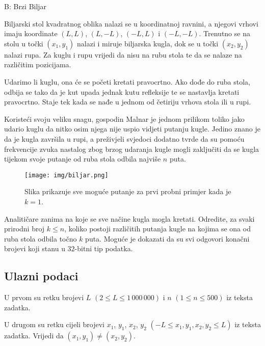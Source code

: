\begin{statement}[
  timelimit=1 s,
  memorylimit=512 MiB,
]{B: Brzi Biljar}

Biljarski stol kvadratnog oblika nalazi se u koordinatnoj ravnini, a njegovi
vrhovi imaju koordinate $(L,L)$, $(L,-L)$, $(-L,L)$ i $(-L,-L)$. Trenutno se
na stolu u točki $(x_1, y_1)$ nalazi i miruje biljarska kugla, dok se u točki
$(x_2, y_2)$ nalazi rupa. Za kuglu i rupu vrijedi da nisu na rubu stola te da
se nalaze na različitim pozicijama.

Udarimo li kuglu, ona će se početi kretati pravocrtno. Ako dođe do ruba stola,
odbija se tako da je kut upada jednak kutu refleksije te se nastavlja kretati
pravocrtno. Staje tek kada se nađe u jednom od četiriju vrhova stola ili u
rupi.

Koristeći svoju veliku snagu, gospodin Malnar je jednom prilikom toliko jako
udario kuglu da nitko osim njega nije uspio vidjeti putanju kugle. Jedino
znano je da je kugla završila u rupi, a preživjeli svjedoci dodatno tvrde da
su pomoću frekvencije zvuka nastalog zbog brzog udaranja kugle mogli
zaključiti da se kugla tijekom svoje putanje od ruba stola odbila najviše $n$
puta.

\begin{figure}[h]
\centering
\texttt{[image: img/biljar.png]}
\caption{Slika prikazuje sve moguće putanje za prvi probni primjer kada je $k=1$.}
\end{figure}

Analitičare zanima na koje se sve načine kugla mogla kretati. Odredite, za
svaki prirodni broj $k \le n$, koliko postoji različitih putanja kugle na
kojima se ona od ruba stola odbila točno $k$ puta. Moguće je dokazati da su
svi odgovori konačni brojevi koji stanu u $32$-bitni tip podatka.

\subsection*{Ulazni podaci}
U prvom su retku brojevi $L$ $(2 \le L \le 1\,000\,000)$ i $n$ $(1 \le n \le
500)$ iz teksta zadatka.

U drugom su retku cijeli brojevi $x_1$, $y_1$, $x_2$, $y_2$ $(-L \le x_1,
y_1, x_2, y_2 \le L)$ iz teksta zadatka. Vrijedi da $(x_1, y_1) \ne (x_2, y_2)$.


\end{statement}
